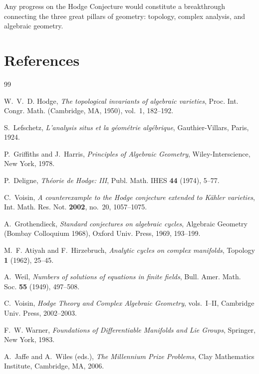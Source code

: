 \documentclass[12pt,a4paper]{amsart}
\theoremstyle{definition}
\theoremstyle{remark}
\begin{document}
Any progress on the Hodge Conjecture would constitute a breakthrough connecting
the three great pillars of geometry: topology, complex analysis, and algebraic
geometry.

\section{References}
\label{sec:references}

\begin{thebibliography}{99}

W.~V.~D. Hodge,
\textit{The topological invariants of algebraic varieties},
Proc. Int. Congr. Math. (Cambridge, MA, 1950), vol.~1, 182--192.

S.~Lefschetz,
\textit{L'analysis situs et la g\'eom\'etrie alg\'ebrique},
Gauthier-Villars, Paris, 1924.

P.~Griffiths and J.~Harris,
\textit{Principles of Algebraic Geometry},
Wiley-Interscience, New York, 1978.

P.~Deligne,
\textit{Th\'eorie de Hodge: III},
Publ. Math. IHES \textbf{44} (1974), 5--77.

C.~Voisin,
\textit{A counterexample to the Hodge conjecture extended to K\"ahler varieties},
Int. Math. Res. Not. \textbf{2002}, no.~20, 1057--1075.

A.~Grothendieck,
\textit{Standard conjectures on algebraic cycles},
Algebraic Geometry (Bombay Colloquium 1968), Oxford Univ. Press, 1969, 193--199.

M.~F. Atiyah and F.~Hirzebruch,
\textit{Analytic cycles on complex manifolds},
Topology \textbf{1} (1962), 25--45.

A.~Weil,
\textit{Numbers of solutions of equations in finite fields},
Bull. Amer. Math. Soc. \textbf{55} (1949), 497--508.

C.~Voisin,
\textit{Hodge Theory and Complex Algebraic Geometry}, vols.~I--II,
Cambridge Univ. Press, 2002--2003.

F.~W. Warner,
\textit{Foundations of Differentiable Manifolds and Lie Groups},
Springer, New York, 1983.

A.~Jaffe and A.~Wiles (eds.),
\textit{The Millennium Prize Problems},
Clay Mathematics Institute, Cambridge, MA, 2006.

\end{thebibliography}
\end{document}
